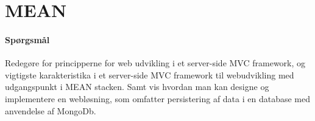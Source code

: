 \section{MEAN}

\paragraph{Spørgsmål}
Redegøre for principperne for web udvikling i et server-side MVC framework, og vigtigste karakteristika i et server-side	MVC framework til webudvikling med udgangspunkt i MEAN stacken.	Samt vis hvordan man kan designe og implementere en	webløsning, som omfatter persistering af data i en database	med anvendelse af MongoDb.
